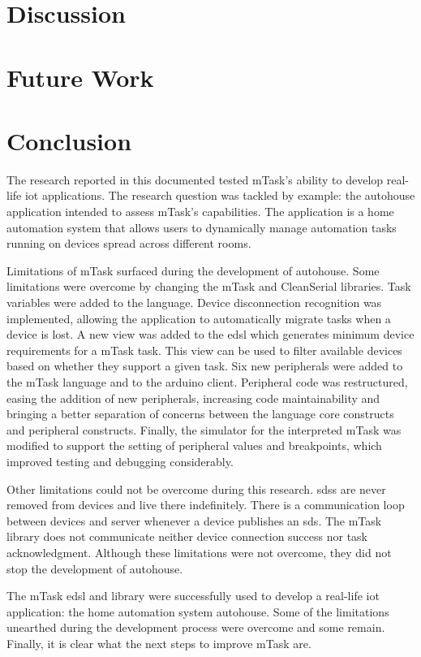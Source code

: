 \section{Discussion}
\section{Future Work}
\section{Conclusion}

The research reported in this documented tested \gls{mTask}'s ability to develop real-life \acs{iot} applications. The research question was tackled by example: the \gls{autohouse} application intended to assess \gls{mTask}'s capabilities. The application is a home automation system that allows users to dynamically manage automation tasks running on devices spread across different rooms. 

Limitations of \gls{mTask} surfaced during the development of \gls{autohouse}. Some limitations were overcome by changing the \gls{mTask} and CleanSerial libraries. Task variables were added to the language. Device disconnection recognition was implemented, allowing the application to automatically migrate tasks when a device is lost. A new view was added to the \ac{edsl} which generates minimum device requirements for a \gls{mTask} task. This view can be used to filter available devices based on whether they support a given task. Six new peripherals were added to the \gls{mTask} language and to the \gls{arduino} client. Peripheral code was restructured, easing the addition of new peripherals, increasing code maintainability and bringing a better separation of concerns between the language core constructs and peripheral constructs. Finally, the simulator for the interpreted \gls{mTask} was modified to support the setting of peripheral values and breakpoints, which improved testing and debugging considerably.

Other limitations could not be overcome during this research. \acsp{sds} are never removed from devices and live there indefinitely. There is a communication loop between devices and server whenever a device publishes an \acs{sds}. The \gls{mTask} library does not communicate neither device connection success nor task acknowledgment. Although these limitations were not overcome, they did not stop the development of \gls{autohouse}. 

The \gls{mTask} \acs{edsl} and library were successfully used to develop a real-life \acs{iot} application: the home automation system \gls{autohouse}. Some of the limitations unearthed during the development process were overcome and some remain. Finally, it is clear what the next steps to improve \gls{mTask} are.